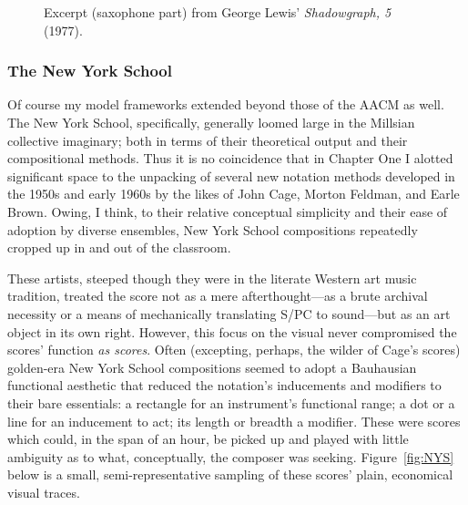     \begin{figure}
        \centering
        \captionsetup{width=.5\textwidth}
        \caption[Excerpt (saxophone part) from George Lewis' \textit{Shadowgraph, 5} (1977).]{Excerpt (saxophone part) from George Lewis' \textit{Shadowgraph, 5} (1977).\footnotemark}
        \label{fig:Shadowgraph}
    \end{figure}

    \subsubsection{The New York School}
    Of course my model frameworks extended beyond those of the AACM as well. The New York School, specifically, generally loomed large in the Millsian collective imaginary; both in terms of their theoretical output and their compositional methods. Thus it is no coincidence that in Chapter One I alotted significant space to the unpacking of several new notation methods developed in the 1950s and early 1960s by the likes of John Cage, Morton Feldman, and Earle Brown. Owing, I think, to their relative conceptual simplicity and their ease of adoption by diverse ensembles, New York School compositions repeatedly cropped up in and out of the classroom.

    These artists, steeped though they were in the literate Western art music tradition, treated the score not as a mere afterthought---as a brute archival necessity or a means of mechanically translating S/PC to sound---but as an art object in its own right. However, this focus on the visual never compromised the scores' function \textit{as scores}. Often (excepting, perhaps, the wilder of Cage's scores) golden-era New York School compositions seemed to adopt a Bauhausian functional aesthetic that reduced the notation's inducements and modifiers to their bare essentials: a rectangle for an instrument's functional range; a dot or a line for an inducement to act; its length or breadth a modifier. These were scores which could, in the span of an hour, be picked up and played with little ambiguity as to what, conceptually, the composer was seeking. Figure~\ref{fig:NYS} below is a small, semi-representative sampling of these scores' plain, economical visual traces.
    
